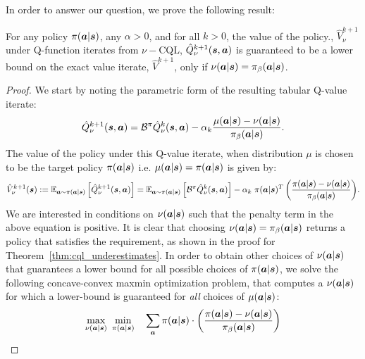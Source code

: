 In order to answer our question, we prove the following result:
\begin{theorem} For any policy $\pi(\boldsymbol{a}|\boldsymbol{s})$, any $\alpha > 0$, and for all $k > 0$, the value of the policy., $\hat{V}^{k+1}_\nu$ under Q-function iterates from $\nu-$CQL, $\hat{Q}^{k+1}_\nu(\boldsymbol{s}, \boldsymbol{a})$ is guaranteed to be a lower bound on the exact value iterate, $\hat{V}^{k+1}$, only if $\nu(\boldsymbol{a}|\boldsymbol{s}) = {\pi_\beta}(\boldsymbol{a}|\boldsymbol{s})$.   
\end{theorem}

\begin{proof}
We start by noting the parametric form of the resulting tabular Q-value iterate:
\begin{equation}
    \hat{Q}^{k+1}_\nu(\boldsymbol{s}, \boldsymbol{a}) = \mathcal{B}^\pi \hat{Q}^{k}_\nu(\boldsymbol{s}, \boldsymbol{a}) - \alpha_k \frac{\mu(\boldsymbol{a}|\boldsymbol{s}) - \nu(\boldsymbol{a}|\boldsymbol{s})}{{\pi_\beta}(\boldsymbol{a}|\boldsymbol{s})}.
    \label{eqn:q_value_nu}
\end{equation}
The value of the policy under this Q-value iterate, when distribution $\mu$ is chosen to be the target policy $\pi(\boldsymbol{a}|\boldsymbol{s})$ i.e. $\mu(\boldsymbol{a}|\boldsymbol{s}) = \pi(\boldsymbol{a}|\boldsymbol{s})$ is given by:
\begin{equation}
    \small{\hat{V}^{k+1}_\nu(\boldsymbol{s}): = \mathbb{E}_{\boldsymbol{a} \sim \pi(\boldsymbol{a}|\boldsymbol{s})}\left[\hat{Q}^{k+1}_\nu(\boldsymbol{s}, \boldsymbol{a})\right] = \mathbb{E}_{\boldsymbol{a} \sim \pi(\boldsymbol{a}|\boldsymbol{s})}\left[\mathcal{B}^\pi\hat{Q}^k_\nu(\boldsymbol{s}, \boldsymbol{a}) \right] - \alpha_k~ \pi(\boldsymbol{a}|\boldsymbol{s})^T \left(\frac{\pi(\boldsymbol{a}|\boldsymbol{s}) - \nu(\boldsymbol{a}|\boldsymbol{s})}{{\pi_\beta}(\boldsymbol{a}|\boldsymbol{s})}\right)}. 
\end{equation}
We are interested in conditions on $\nu(\boldsymbol{a}|\boldsymbol{s})$ such that the penalty term in the above equation is positive. It is clear that choosing $\nu(\boldsymbol{a}|\boldsymbol{s}) = {\pi_\beta}(\boldsymbol{a}|\boldsymbol{s})$ returns a policy that satisfies the requirement, as shown in the proof for Theorem~\ref{thm:cql_underestimates}. In order to obtain other choices of $\nu(\boldsymbol{a}|\boldsymbol{s})$ that guarantees a lower bound for all possible choices of $\pi(\boldsymbol{a}|\boldsymbol{s})$, we solve the following concave-convex maxmin optimization problem, that computes a $\nu(\boldsymbol{a}|\boldsymbol{s})$ for which a lower-bound is guaranteed for \textit{all} choices of $\mu(\boldsymbol{a}|\boldsymbol{s})$:
\begin{align*}
    \max_{\nu(\mathbf{a}|\bs)} ~\min_{\policy(\mathbf{a}|\bs)}~~& ~\sum_{\mathbf{a}} \policy(\mathbf{a}|\bs) \cdot \left(\frac{\policy(\mathbf{a}|\bs) - \nu(\mathbf{a}|\bs)}{\behavior(\mathbf{a}|\bs)}\right)\\

\end{align*}
\end{proof}

